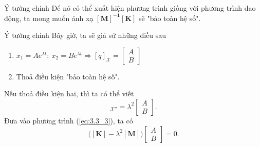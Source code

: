 \begin{frame}{Ý tưởng chính}
    Để nó có thể xuất hiện phương trình giống với phương trình dao động, ta mong muốn ánh xạ $\mathbf{[M]^{-1}}\mathbf{[K]}$ sẽ "bảo toàn hệ số".
    \begin{center}
        \resizebox{0.8\linewidth}{!}{}
    \end{center}
\end{frame}
\begin{frame}{Ý tưởng chính}
    Bây giờ, ta sẽ giả sử những điều sau
    \begin{enumerate}[\textbullet]
        \item \(x_1 = A e^{\lambda t}  ; \ x_2 = B e^{\lambda t} \Rightarrow [q]_{\mathcal{X}} = 
            \left[
            \begin{array}{c}
            A  \\
            B 
            \end{array} \right] \) \cite{morin2008introduction} \cite{taylor2005classic}
        \item Thoả điều kiện "bảo toàn hệ số".
    \end{enumerate}
    Nếu thoả điều kiện hai, thì ta có thể viết
    \begin{equation}
        [q'']_{\mathcal{X}''} = \lambda^2             
        \left[
            \begin{array}{c}
            A  \\
            B 
            \end{array} 
        \right].
        \label{eq:3.4_1}
    \end{equation}
    Đưa vào phương trình (\ref{eq:3.3_3}), ta có
    \begin{equation}
        \Big(\mathbf{[K]} - \lambda^2 \mathbf{[M]}\Big) 
        \left[
            \begin{array}{c}
            A  \\
            B 
            \end{array} 
        \right] = 0.
        \label{eq:3.4_2}
    \end{equation}
\end{frame}

